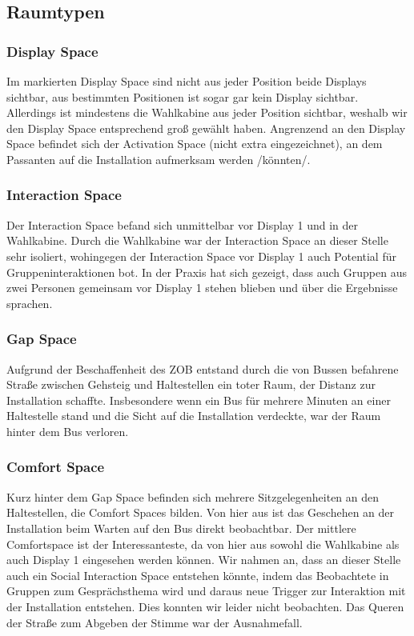 \subsection{Raumtypen}\label{raumtypen}

\subsubsection{Display Space}\label{display-space}

Im markierten Display Space sind nicht aus jeder Position beide Displays sichtbar, aus bestimmten Positionen ist sogar gar kein Display sichtbar.
Allerdings ist mindestens die Wahlkabine aus jeder Position sichtbar, weshalb wir den Display Space entsprechend groß gewählt haben.
Angrenzend an den Display Space befindet sich der Activation Space (nicht extra eingezeichnet), an dem Passanten auf die Installation aufmerksam werden /könnten/.

\subsubsection{Interaction Space}\label{interaction-space}

Der Interaction Space befand sich unmittelbar vor Display 1 und in der Wahlkabine.
Durch die Wahlkabine war der Interaction Space an dieser Stelle sehr isoliert, wohingegen der Interaction Space vor Display 1 auch Potential für Gruppeninteraktionen bot.
In der Praxis hat sich gezeigt, dass auch Gruppen aus zwei Personen gemeinsam vor Display 1 stehen blieben und über die Ergebnisse sprachen.

\subsubsection{Gap Space}\label{gap-space}

Aufgrund der Beschaffenheit des ZOB entstand durch die von Bussen befahrene Straße zwischen Gehsteig und Haltestellen ein toter Raum, der Distanz zur Installation schaffte.
Insbesondere wenn ein Bus für mehrere Minuten an einer Haltestelle stand und die Sicht auf die Installation verdeckte, war der Raum hinter dem Bus verloren.

\subsubsection{Comfort Space}\label{comfort-space}

Kurz hinter dem Gap Space befinden sich mehrere Sitzgelegenheiten an den Haltestellen, die Comfort Spaces bilden.
Von hier aus ist das Geschehen an der Installation beim Warten auf den Bus direkt beobachtbar.
Der mittlere Comfortspace ist der Interessanteste, da von hier aus sowohl die Wahlkabine als auch Display 1 eingesehen werden können.
Wir nahmen an, dass an dieser Stelle auch ein Social Interaction Space entstehen könnte, indem das Beobachtete in Gruppen zum Gesprächsthema wird und daraus neue Trigger zur Interaktion mit der Installation entstehen.
Dies konnten wir leider nicht beobachten.
Das Queren der Straße zum Abgeben der Stimme war der Ausnahmefall.